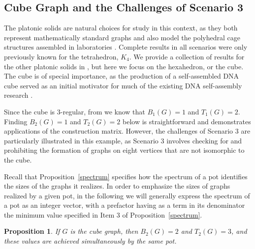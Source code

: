 \documentclass{elsarticle}
\newtheorem{proposition}[theorem]{Proposition}
\theoremstyle{definition}
\theoremstyle{remark}
\theoremstyle{plain}
\theoremstyle{plain}
\begin{document}
\subsection{Cube Graph and the Challenges of Scenario 3} \label{sec:cube}

The platonic solids are natural choices for study in this context, as they both represent mathematically standard graphs and also model the polyhedral cage structures assembled in laboratories \cite{zhang2012}. Complete results in all scenarios were only previously known for the tetrahedron, $K_4$. We provide a collection of results for the other platonic solids in \cite{repository}, but here we focus on the hexahedron, or the cube. The cube is of special importance, as the production of a self-assembled DNA cube served as an initial motivator for much of the existing DNA self-assembly research \cite{Seeman82}.



Since the cube is 3-regular, from \cite{ellis2014minimal} we know that $B_1(G)=1$ and $T_1(G)=2$.  Finding $B_2(G)=1$ and $T_2(G)=2$  below is straightforward and demonstrates applications of the construction matrix.  However, the challenges of Scenario 3 are particularly illustrated in this example, as Scenario 3 involves checking for and prohibiting the formation of graphs on eight vertices that are not isomorphic to the cube.  


Recall that Proposition~\ref{spectrum} specifies how the spectrum of a pot identifies the sizes of the graphs it realizes. In order to emphasize the sizes of graphs realized by a given pot, in the following we will generally express the spectrum of a pot as an integer vector, with a prefactor having as a term in its denominator the minimum value specified in Item 3 of Proposition~\ref{spectrum}.

\begin{proposition}
If $G$ is the cube graph, then $B_2(G)=2$ and $T_2(G)=3$, and these values are achieved simultaneously by the same pot.
\end{proposition}
\end{document}
